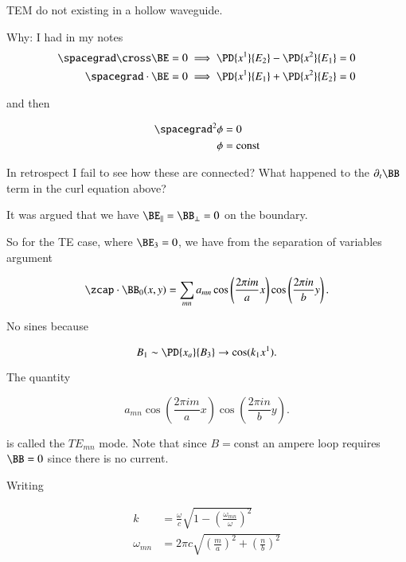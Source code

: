 \begin{claim}TEM do not existing in a hollow waveguide.
\end{claim}

Why: I had in my notes
\begin{align*}
\spacegrad \cross \BE = 0 & \implies \PD{x^1}{E_2} -\PD{x^2}{E_1} = 0 \\
\spacegrad \cdot \BE = 0 & \implies \PD{x^1}{E_1} +\PD{x^2}{E_2} = 0
\end{align*}

and then

\begin{align*}
\spacegrad^2 \phi &= 0 \\
\phi &= \text{const}
\end{align*}

In retrospect I fail to see how these are connected?  What happened to the $\partial_t \BB$ term in the curl equation above?

It was argued that we have $\BE_\parallel = \BB_\perp = 0$ on the boundary.

So for the TE case, where $\BE_3 = 0$, we have from the separation of variables argument

\begin{equation}\label{eqn:relativisticElectrodynamicsT4:440}
\zcap \cdot \BB_0(x, y) =
\sum_{m n} a_{m n} 
\cos\left( \frac{2 \pi i m}{a} x \right)
\cos\left( \frac{2 \pi i n}{b} y \right).
\end{equation}

No sines because 

\begin{equation}\label{eqn:relativisticElectrodynamicsT4:460}
B_1 \sim \PD{x_a}{B_3} \rightarrow \cos(k_1 x^1).
\end{equation}

The quantity

\begin{equation}\label{eqn:relativisticElectrodynamicsT4:480}
a_{m n}
\cos\left( \frac{2 \pi i m}{a} x \right)
\cos\left( \frac{2 \pi i n}{b} y \right).
\end{equation}

is called the $TE_{m n}$ mode.  Note that since $B = \text{const}$ an ampere loop requires $\BB = 0$ since there is no current.

Writing 

\begin{align}\label{eqn:relativisticElectrodynamicsT4:500}
k &= \frac{\omega}{c} \sqrt{ 1 - \left(\frac{\omega_{m n}}{\omega}\right)^2 } \\
\omega_{m n} &= 2 \pi c \sqrt{ \left(\frac{m}{a} \right)^2 + \left(\frac{n}{b} \right)^2 }
\end{align}

